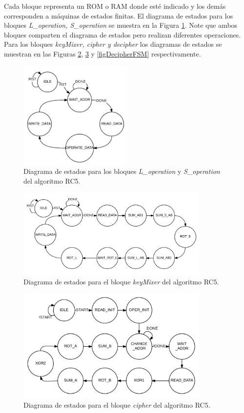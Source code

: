 Cada bloque representa un ROM o RAM donde esté indicado y los demás corresponden a máquinas de estados finitas. El diagrama de estados para los bloques \textit{L\_operation, S\_operation} se muestra en la Figura \ref{figSL_operationFSM}. Note que ambos bloques comparten el diagrama de estados pero realizan diferentes operaciones. Para los bloques \textit{keyMixer, cipher y decipher} los diagramas de estados se muestran en las Figuras \ref{figKeyMixerFSM}, \ref{figCipherFSM} y \ref{figDecipherFSM} respectivamente.

\begin{figure}
	\centering
	\includegraphics[width=0.5\textwidth]{./images/figSL_operationFSM}
	\caption{Diagrama de estados para los bloques \textit{L\_operation} y \textit{S\_operation} del algoritmo RC5.}
	\label{figSL_operationFSM}
\end{figure}
\begin{figure}
	\centering
	\includegraphics[width=0.85\textwidth]{./images/figKeyMixerFSM}
	\caption{Diagrama de estados para el bloque \textit{keyMixer} del algoritmo RC5.}
	\label{figKeyMixerFSM}
\end{figure}
\begin{figure}
	\centering
	\includegraphics[width=0.85\textwidth]{./images/figCipherFSM}
	\caption{Diagrama de estados para el bloque \textit{cipher} del algoritmo RC5.}
	\label{figCipherFSM}
\end{figure}

